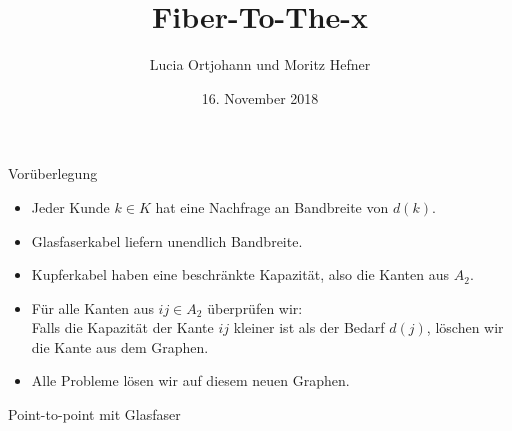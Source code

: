 \documentclass{beamer}
\title[Projekt 2]{Fiber-To-The-x}
\author{Lucia Ortjohann und Moritz Hefner}
\institute[]{Netzwerkoptimierung in der Praxis}
\date{16. November 2018}
\begin{document}
	\begin{frame} %
		\titlepage
	\end{frame}
	
	\begin{frame}{Vor\"uberlegung}
	\begin{itemize}
		\item Jeder Kunde \(k \in K\) hat  eine Nachfrage an Bandbreite von $d(k)$.
		\item Glasfaserkabel liefern unendlich Bandbreite.
		\item Kupferkabel haben eine beschr\"ankte Kapazit\"at, also die Kanten aus $A_2$.
		\vspace{0.8cm}
		\pause
		\item F\"ur alle Kanten aus $ij \in A_2$ \"uberpr\"ufen wir:\\
		Falls die Kapazit\"at der Kante $ij$ kleiner ist als der Bedarf  $d(j)$,
		l\"oschen wir die Kante aus dem Graphen.
		\item Alle Probleme l\"osen wir auf diesem neuen Graphen. 
	\end{itemize}
		
	\end{frame}
	\begin{frame}{Point-to-point mit Glasfaser}

	\end{frame}
\end{document}
